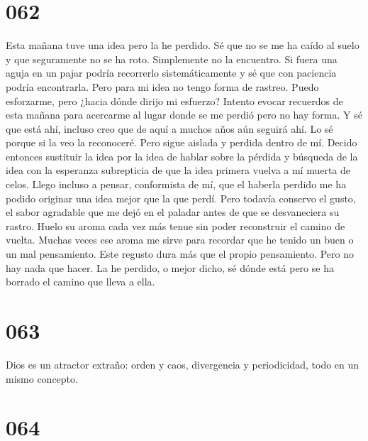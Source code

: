 \documentclass[a4paper,11pt,openright,twocolumn]{book}
\begin{document}
\section*{062}

Esta mañana tuve una idea pero la he perdido. Sé que no se me ha caído al suelo y que seguramente no se ha roto. Simplemente no la encuentro. Si fuera una aguja en un pajar podría recorrerlo sistemáticamente y sé que con paciencia podría encontrarla. Pero para mi idea no tengo forma de rastreo. Puedo esforzarme, pero ¿hacia dónde dirijo mi esfuerzo? Intento evocar recuerdos de esta mañana para acercarme al lugar donde se me perdió pero no hay forma. Y sé que está ahí, incluso creo que de aquí a muchos años aún seguirá ahí. Lo sé porque si la veo la reconoceré. Pero sigue aislada y perdida dentro de mí. Decido entonces sustituir la idea por la idea de hablar sobre la pérdida y búsqueda de la idea con la esperanza subrepticia de que la idea primera vuelva a mí muerta de celos. Llego incluso a pensar, conformista de mí, que el haberla perdido me ha podido originar una idea mejor que la que perdí. Pero todavía conservo el gusto, el sabor agradable que me dejó en el paladar antes de que se desvaneciera su rastro. Huelo su aroma cada vez más tenue sin poder reconstruir el camino de vuelta. Muchas veces ese aroma me sirve para recordar que he tenido un buen o un mal pensamiento. Este regusto dura más que el propio pensamiento. Pero no hay nada que hacer. La he perdido, o mejor dicho, sé dónde está pero se ha borrado el camino que lleva a ella.

\section*{063}

Dios es un atractor extraño: orden y caos, divergencia y periodicidad, todo en un mismo concepto.

\section*{064}
\end{document}

